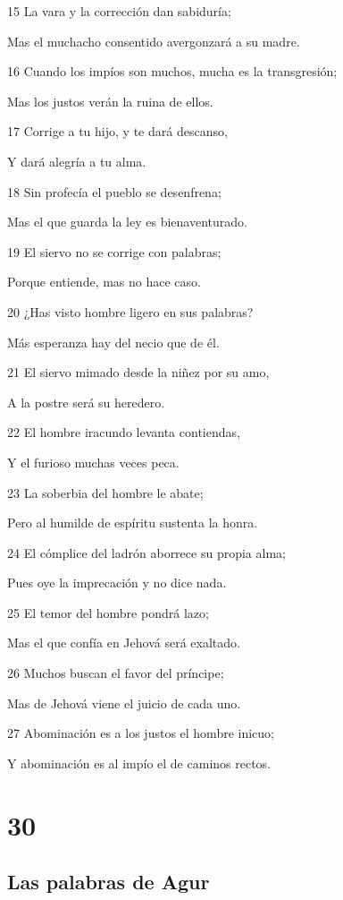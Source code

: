 \par 15 La vara y la corrección dan sabiduría;
\par Mas el muchacho consentido avergonzará a su madre.
\par 16 Cuando los impíos son muchos, mucha es la transgresión;
\par Mas los justos verán la ruina de ellos.
\par 17 Corrige a tu hijo, y te dará descanso,
\par Y dará alegría a tu alma.
\par 18 Sin profecía el pueblo se desenfrena;
\par Mas el que guarda la ley es bienaventurado.
\par 19 El siervo no se corrige con palabras;
\par Porque entiende, mas no hace caso.
\par 20 ¿Has visto hombre ligero en sus palabras?
\par Más esperanza hay del necio que de él.
\par 21 El siervo mimado desde la niñez por su amo,
\par A la postre será su heredero.
\par 22 El hombre iracundo levanta contiendas,
\par Y el furioso muchas veces peca.
\par 23 La soberbia del hombre le abate;
\par Pero al humilde de espíritu sustenta la honra.
\par 24 El cómplice del ladrón aborrece su propia alma;
\par Pues oye la imprecación y no dice nada.
\par 25 El temor del hombre pondrá lazo;
\par Mas el que confía en Jehová será exaltado.
\par 26 Muchos buscan el favor del príncipe;
\par Mas de Jehová viene el juicio de cada uno.
\par 27 Abominación es a los justos el hombre inicuo;
\par Y abominación es al impío el de caminos rectos. 

\chapter{30}

\section*{Las palabras de Agur}

